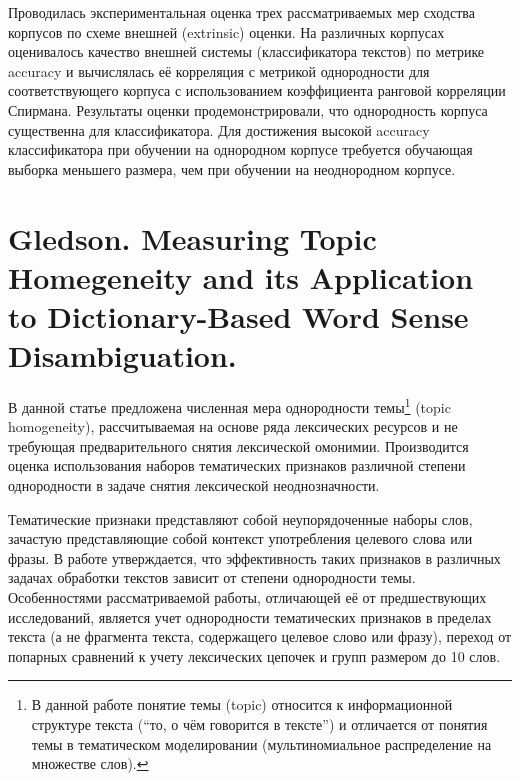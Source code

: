 Проводилась экспериментальная оценка трех рассматриваемых мер сходства корпусов по схеме внешней (extrinsic) оценки. На различных корпусах оценивалось качество внешней системы (классификатора текстов) по метрике accuracy и вычислялась её корреляция с метрикой однородности для соответствующего корпуса с использованием коэффициента ранговой корреляции Спирмана. Результаты оценки продемонстрировали, что однородность корпуса существенна для классификатора. Для достижения высокой accuracy классификатора при обучении на однородном корпусе требуется обучающая выборка меньшего размера, чем при обучении на неоднородном корпусе.


\section{Gledson. Measuring Topic Homegeneity and its Application to Dictionary-Based Word Sense Disambiguation.}

В данной статье предложена численная мера однородности темы\footnote{В данной работе понятие темы (topic) относится к информационной структуре текста (``то, о чём говорится в тексте'') и отличается от понятия темы в тематическом моделировании (мультиномиальное распределение на множестве слов).} (topic homogeneity), рассчитываемая на основе ряда лексических ресурсов и не требующая предварительного снятия лексической омонимии. Производится оценка использования наборов тематических признаков различной степени однородности в задаче снятия лексической неоднозначности.

Тематические признаки представляют собой неупорядоченные наборы слов, зачастую представляющие собой контекст употребления целевого слова или фразы. В работе утверждается, что эффективность таких признаков в различных задачах обработки текстов зависит от степени однородности темы. Особенностями рассматриваемой работы, отличающей её от предшествующих исследований, является учет однородности тематических признаков в пределах текста (а не фрагмента текста, содержащего целевое слово или фразу), переход от попарных сравнений к учету лексических цепочек и групп размером до 10 слов.

